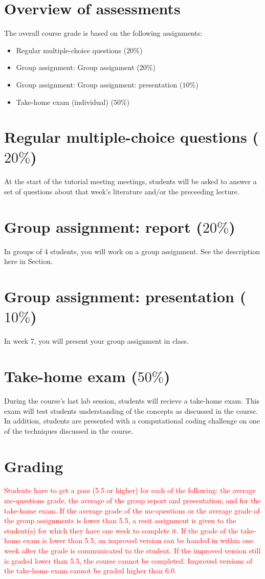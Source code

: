 \documentclass[a4paper,10pt,twocolumn]{report}
\begin{document}
	\section{Overview of assessments}
	The overall course grade is based on the following assignments:
	\begin{itemize}
		\item Regular multiple-choice questions (\(20\%\))
		\item Group assignment: Group assignment (\(20\%\))
		\item Group assignment: Group assignment: presentation (\(10\%\))
		\item Take-home exam (individual) (\(50\%\))
	\end{itemize}

	
	\section{Regular multiple-choice questions ($20\%$)}
At the start of the tutorial meeting meetings, students will be asked to answer a set of questions about that week's literature and/or the preceeding lecture. 
	
	\section{Group assignment: report ($20\%$)}
In groups of 4 students, you will work on a group assignment. See the description here in Section.

	\section{Group assignment: presentation ($10\%$)}
In week 7, you will present your group assignment in class. 
	
	\section{Take-home exam ($50\%$)}
	During the course's last lab session, students will recieve a take-home exam. This exam will test students understanding of the concepts as discussed in the course. In addition, students are presented with a computational coding challenge on one of the techniques discussed in the course. 

	\section{Grading}
	\textcolor{red}{Students have to get a pass (5.5 or higher) for each of the following: the average mc-questions grade, the average of the group report and presentation, and for the take-home exam. If the average grade of the mc-questions or the average grade of the group assignments is lower than 5.5, a resit assignment is given to the student(s) for which they have one week to complete it. If the grade of the take-home exam is lower than 5.5, an improved version can be handed in within one week after the grade is communicated to the student. If the improved version still is graded lower than 5.5, the course cannot be completed. Improved versions of the take-home exam cannot be graded higher than 6.0.} 
	
\end{document}
